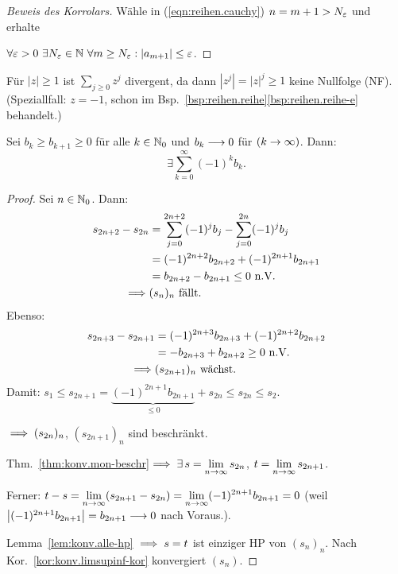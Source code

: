\documentclass[12pt]{scrreprt}
\begin{document}
\begin{proof}[Beweis des Korrolars] Wähle in (\ref{eqn:reihen.cauchy}) $n=m+1>N_\varepsilon$ und erhalte

$\forall\ep > 0\ \exists \nat{N_\ep}\ \forall m\geq N_\ep: \abs{a_{m+1}}\leq\ep$.
\end{proof}

\begin{bsp}
  \label{bsp:reihen.konv-nf}
  Für $|z|\geq 1$ ist $\sum_{j\geq 0}z^j$ divergent, da dann $|z^j|=|z|^j\geq 1$ keine Nullfolge (NF). (Speziallfall: $z=-1$, schon im Bsp.~\ref{bsp:reihen.reihe}\ref{bsp:reihen.reihe-e} behandelt.)
\end{bsp}

\begin{satz}
  \label{satz:reihen.leibniz}
  Sei $b_k\geq b_{k+1}\geq 0$ für alle $k\in\mathbb{N}_0$ und $b_k\longrightarrow 0$ für $(k\rightarrow\infty)$. Dann:
  \[\exists\sum^\infty_{k=0}(-1)^k b_k.\]
\end{satz}

\begin{proof}
Sei $n\in\mathbb{N}_0$. Dann:
\begin{align*}
s_{2n+2}-s_{2n} &=\sum^{2n+2}_{j=0}(-1)^j b_j -\sum^{2n}_{j=0}(-1)^j b_j\\
&=(-1)^{2n+2}b_{2n+2}+(-1)^{2n+1}b_{2n+1}\\
&=b_{2n+2}-b_{2n+1}\leq 0\ \text{n.V.}\\
\implies& (s_n)_n\ \text{fällt.}
\end{align*}
Ebenso:
\begin{align*}
s_{2n+3}-s_{2n+1} &= (-1)^{2n+3}b_{2n+3}+(-1)^{2n+2}b_{2n+2}\\
&=-b_{2n+3}+b_{2n+2}\geq 0\ \text{n.V.}\\
\implies&(s_{2n+1})_n\ \text{wächst.}
\end{align*}
Damit: $s_1 \leq s_{2n+1} = \underbrace{(-1)^{2n+1}b_{2n+1}}_{\leq 0} + s_{2n} \leq s_{2n} \leq s_2$.

$\implies (s_{2n})_n$, $(s_{2n+1})_n$ sind beschränkt.

Thm.~\ref{thm:konv.mon-beschr}$\implies\exists\,s=\displaystyle\lim_{n\rightarrow\infty}s_{2n}$, $t=\displaystyle\lim_{n\rightarrow\infty}s_{2n+1}$.

Ferner: $t-s = \displaystyle\lim_{n\rightarrow\infty}(s_{2n+1}-s_{2n}) = \displaystyle\lim_{n\rightarrow\infty}(-1)^{2n+1}b_{2n+1}=0$ (weil $\left\lvert(-1)^{2n+1}b_{2n+1}\right\lvert = b_{2n+1}\longrightarrow 0$ nach Voraus.).

Lemma~\ref{lem:konv.alle-hp} $\implies s=t$ ist einziger HP von $(s_n)_n$. Nach Kor.~\ref{kor:konv.limsupinf-kor} konvergiert $(s_n)$.
\end{proof}
\end{document}
